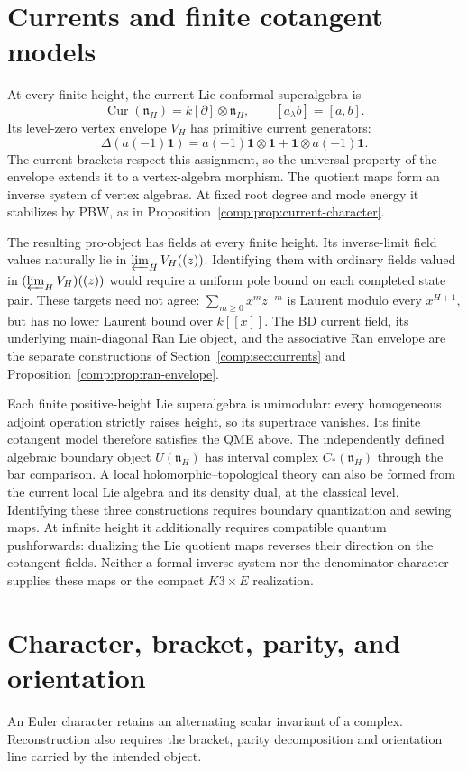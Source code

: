 \section{Currents and finite cotangent models}
At every finite height, the current Lie conformal superalgebra is
\[
 \operatorname{Cur}(\mathfrak n_H)=k[\partial]\otimes\mathfrak n_H,
 \qquad[a_\lambda b]=[a,b].
\]
Its level-zero vertex envelope $V_H$ has primitive current generators:
\[
 \Delta(a(-1)\mathbf1)
 =a(-1)\mathbf1\otimes\mathbf1+\mathbf1\otimes a(-1)\mathbf1.
\]
The current brackets respect this assignment, so the universal property of
the envelope extends it to a vertex-algebra morphism.
The quotient maps form an inverse system of vertex algebras.
At fixed root degree and mode energy it stabilizes by PBW, as in
Proposition~\ref{comp:prop:current-character}.

The resulting pro-object has fields at every finite height.
Its inverse-limit field values naturally lie in
$\varprojlim_H V_H((z))$.
Identifying them with ordinary fields valued in $(\varprojlim_HV_H)((z))$
would require a uniform pole bound on each completed state pair.
These targets need not agree: $\sum_{m\ge0}x^mz^{-m}$ is Laurent modulo every
$x^{H+1}$, but has no lower Laurent bound over $k[[x]]$.
The BD current field, its underlying main-diagonal Ran Lie object, and the
associative Ran envelope are the separate constructions of
Section~\ref{comp:sec:currents} and Proposition~\ref{comp:prop:ran-envelope}.

Each finite positive-height Lie superalgebra is unimodular: every homogeneous
adjoint operation strictly raises height, so its supertrace vanishes.
Its finite cotangent model therefore satisfies the QME above.
The independently defined algebraic boundary object $U(\mathfrak n_H)$ has
interval complex $C_*(\mathfrak n_H)$ through the bar comparison.
A local holomorphic--topological theory can also be formed from the current
local Lie algebra and its density dual, at the classical level.
Identifying these three constructions requires boundary quantization and sewing maps.
At infinite height it additionally requires compatible quantum pushforwards:
dualizing the Lie quotient maps reverses their direction on the cotangent fields.
Neither a formal inverse system nor the denominator character supplies these maps
or the compact $K3\times E$ realization.

\section{Character, bracket, parity, and orientation}
An Euler character retains an alternating scalar invariant of a complex.
Reconstruction also requires the bracket, parity decomposition and orientation
line carried by the intended object.

